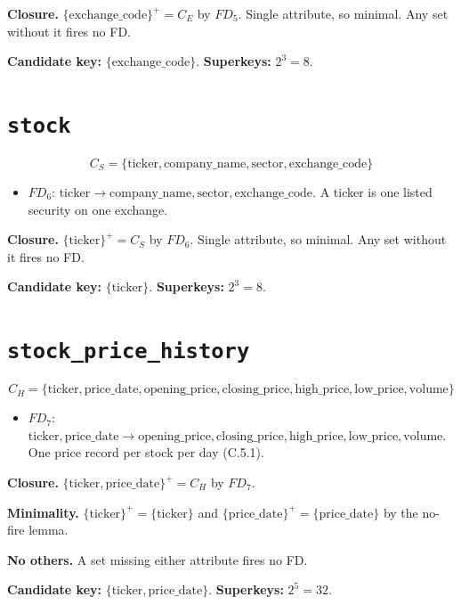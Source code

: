 \documentclass{article}
\newcommand{\at}[1]{\text{#1}}
\newcommand{\cl}[1]{\{#1\}^+}
\newcommand{\fdl}[1]{\hyperref[fd:#1]{$FD_{#1}$}}
\newcommand{\fd}[4]{\item \phantomsection\label{fd:#1}$FD_{#1}$: $#2 \rightarrow #3$. #4}
\begin{document}
\textbf{Closure.} $\cl{\at{exchange\_code}} = C_E$ by \fdl{5}. Single attribute, so minimal. Any set without it fires no FD.

\textbf{Candidate key:} $\{\at{exchange\_code}\}$. \textbf{Superkeys:} $2^3 = 8$.

\section{\texttt{stock}}\label{r:stock}

\[ C_S = \{\at{ticker}, \at{company\_name}, \at{sector}, \at{exchange\_code}\} \]

\begin{itemize}[nosep]
  \fd{6}{\at{ticker}}{\at{company\_name}, \at{sector}, \at{exchange\_code}}{A ticker is one listed security on one exchange.}
\end{itemize}

\textbf{Closure.} $\cl{\at{ticker}} = C_S$ by \fdl{6}. Single attribute, so minimal. Any set without it fires no FD.

\textbf{Candidate key:} $\{\at{ticker}\}$. \textbf{Superkeys:} $2^3 = 8$.

\section{\texttt{stock\_price\_history}}\label{r:stock_price_history}

\[ C_H = \{\at{ticker}, \at{price\_date}, \at{opening\_price}, \at{closing\_price}, \at{high\_price}, \at{low\_price}, \at{volume}\} \]

\begin{itemize}[nosep]
  \fd{7}{\at{ticker}, \at{price\_date}}{\at{opening\_price}, \at{closing\_price}, \at{high\_price}, \at{low\_price}, \at{volume}}{One price record per stock per day (C.5.1).}
\end{itemize}

\textbf{Closure.} $\cl{\at{ticker}, \at{price\_date}} = C_H$ by \fdl{7}.

\textbf{Minimality.} $\cl{\at{ticker}} = \{\at{ticker}\}$ and $\cl{\at{price\_date}} = \{\at{price\_date}\}$ by the no-fire lemma.

\textbf{No others.} A set missing either attribute fires no FD.

\textbf{Candidate key:} $\{\at{ticker}, \at{price\_date}\}$. \textbf{Superkeys:} $2^5 = 32$.
\end{document}
